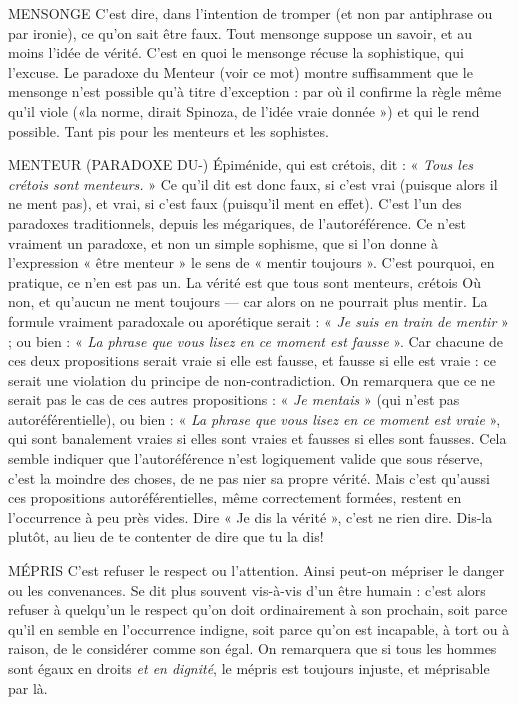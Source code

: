 MENSONGE C'est dire, dans l'intention de tromper (et non par antiphrase
ou par ironie), ce qu’on sait être faux. Tout mensonge suppose
un savoir, et au moins l’idée de vérité. C’est en quoi le mensonge récuse
la sophistique, qui l’excuse. Le paradoxe du Menteur (voir ce mot) montre suffisamment
que le mensonge n’est possible qu’à titre d'exception : par où il confirme
la règle même qu’il viole («la norme, dirait Spinoza, de l’idée vraie
donnée ») et qui le rend possible. Tant pis pour les menteurs et les sophistes.

MENTEUR (PARADOXE DU-)  Épiménide, qui est crétois, dit : « {\it Tous les
crétois sont menteurs.} » Ce qu'il dit est
donc faux, si c’est vrai (puisque alors il ne ment pas), et vrai, si c’est faux
(puisqu'il ment en effet). C’est l’un des paradoxes traditionnels, depuis les
mégariques, de l’autoréférence. Ce n’est vraiment un paradoxe, et non un
simple sophisme, que si l’on donne à l’expression « être menteur » le sens de
« mentir toujours ». C’est pourquoi, en pratique, ce n’en est pas un. La vérité
est que tous sont menteurs, crétois Où non, et qu'aucun ne ment toujours — car
alors on ne pourrait plus mentir. La formule vraiment paradoxale ou aporétique
serait : « {\it Je suis en train de mentir} » ; ou bien : « {\it La phrase que vous lisez en
ce moment est fausse} ». Car chacune de ces deux propositions serait vraie si elle
est fausse, et fausse si elle est vraie : ce serait une violation du principe de
non-contradiction. On remarquera que ce ne serait pas le cas de ces autres
propositions : « {\it Je mentais} » (qui n’est pas autoréférentielle), ou bien : « {\it La
phrase que vous lisez en ce moment est vraie} », qui sont banalement vraies si elles
sont vraies et fausses si elles sont fausses. Cela semble indiquer que l’autoréférence
n’est logiquement valide que sous réserve, c’est la moindre des choses, de
ne pas nier sa propre vérité. Mais c’est qu’aussi ces propositions autoréférentielles,
même correctement formées, restent en l’occurrence à peu près vides.
Dire « Je dis la vérité », c’est ne rien dire. Dis-la plutôt, au lieu de te contenter
de dire que tu la dis!

MÉPRIS C'est refuser le respect ou l’attention. Ainsi peut-on mépriser le
danger ou les convenances. Se dit plus souvent vis-à-vis d’un être
humain : c’est alors refuser à quelqu'un le respect qu’on doit ordinairement à
son prochain, soit parce qu’il en semble en l’occurrence indigne, soit parce
qu’on est incapable, à tort ou à raison, de le considérer comme son égal. On
remarquera que si tous les hommes sont égaux en droits {\it et en dignité}, le mépris
est toujours injuste, et méprisable par là.

